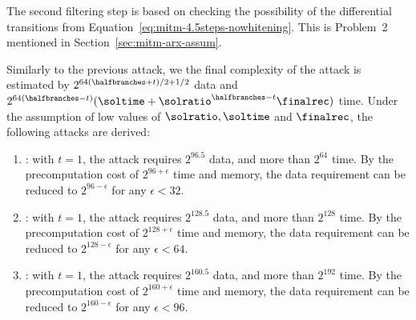 The second filtering step is based on checking the possibility of the differential transitions from Equation~\ref{eq:mitm-4.5steps-nowhitening}. This is Problem~2 mentioned in Section~\ref{sec:mitm-arx-assum}.

Similarly to the previous attack, we the final complexity of the attack is estimated by $2^{64(\halfbranches+t)/2+1/2}$ data and $2^{64(\halfbranches-t)}(\soltime + \solratio^{\halfbranches-t} \finalrec)$ time.
Under the assumption of low values of $\solratio,\soltime$ and $\finalrec$, the following attacks are derived:
\begin{enumerate}
    \item {}: with $t=1$, the attack requires $2^{96.5}$ data, and more than $2^{64}$ time.
    By the precomputation cost of $2^{96+\epsilon}$ time and memory, the data requirement can be reduced to $2^{96-\epsilon}$ for any $\epsilon < 32$.

    \item {}: with $t=1$, the attack requires $2^{128.5}$ data, and more than $2^{128}$ time.
    By the precomputation cost of $2^{128+\epsilon}$ time and memory, the data requirement can be reduced to $2^{128-\epsilon}$ for any $\epsilon < 64$.
    
    \item {}: with $t=1$, the attack requires $2^{160.5}$ data, and more than $2^{192}$ time. By the precomputation cost of $2^{160+\epsilon}$ time and memory, the data requirement can be reduced to $2^{160-\epsilon}$ for any $\epsilon < 96$.
\end{enumerate}



